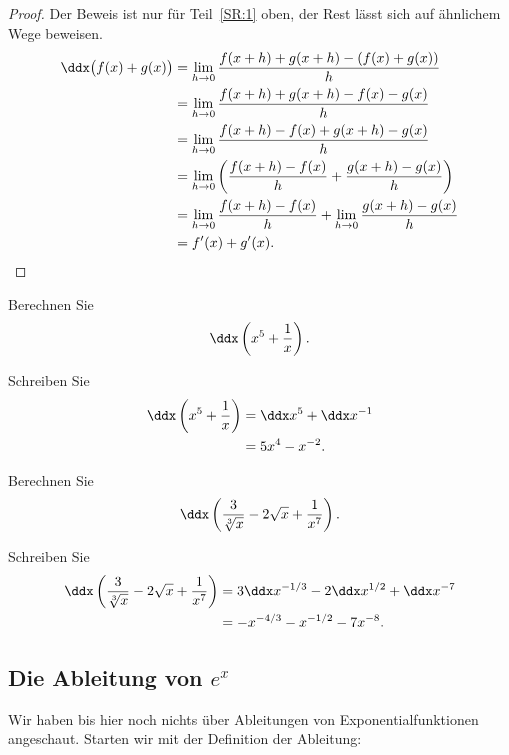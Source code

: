 \begin{proof}
Der Beweis ist nur für Teil~\ref{SR:1} oben, der Rest lässt sich auf ähnlichem Wege beweisen.
\begin{align*}
\ddx\big(f(x)+g(x)\big) &= \lim_{ h\to 0} {f(x+h)+g(x+ h) - (f(x)+g(x))\over  h}  \\
&= \lim_{ h\to 0} {f(x+h)+g(x+ h) - f(x)-g(x)\over  h}  \\
&= \lim_{ h\to 0} {f(x+h)-f(x) +g(x+ h) -g(x)\over  h}  \\
&= \lim_{ h\to 0} \left({f(x+h)-f(x)\over  h}  +{g(x+ h) -g(x)\over  h}\right)  \\
&= \lim_{ h\to 0} {f(x+h)-f(x)\over  h}  +
\lim_{ h\to 0} {g(x+ h) -g(x)\over  h}  \\
&=f'(x)+g'(x).
\end{align*}
\end{proof}



\begin{example}
Berechnen Sie
\[
\ddx \left( x^5+\frac{1}{x}\right).
\] 
\end{example}

\begin{solution}
Schreiben Sie
\begin{align*}
\ddx \left(x^5+\frac{1}{x}\right) &= \ddx x^5 + \ddx x^{-1} \\
&=5x^4 - x^{-2}.
\end{align*}
\end{solution}

\begin{example}
Berechnen Sie
\[
\ddx \left(\frac{3}{\sqrt[3]{x}}-2\sqrt{x}+\frac{1}{x^7}\right).
\]
\end{example}

\begin{solution}
Schreiben Sie
\begin{align*}
\ddx \left(\frac{3}{\sqrt[3]{x}}-2\sqrt{x}+\frac{1}{x^7}\right) &= 3\ddx x^{-1/3} -2\ddx x^{1/2}+\ddx x^{-7}\\
&=-x^{-4/3} - x^{-1/2}-7x^{-8}.
\end{align*}
\end{solution}



\subsection*{Die Ableitung von $\textit{e}^\textit{x}$}

Wir haben bis hier noch nichts über Ableitungen von Exponentialfunktionen angeschaut. Starten wir mit der Definition der Ableitung:

